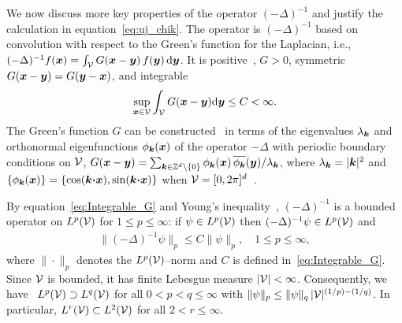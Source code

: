 \documentclass[amsa]{ipart}
\begin{document}
We now discuss more key properties of the operator $(-\Delta)^{-1}$ and
justify the calculation in equation~\eqref{eq:uj_chik}. The operator is
$(-\Delta)^{-1}$ based on convolution with respect to the Green's function
for the Laplacian, i.e.,
$(-\Delta)^{-1}f(\boldsymbol{x})=\int_{\mathcal{V}}G(\boldsymbol{x}-\boldsymbol{y})\,f(\boldsymbol{y})\,\mathrm{d}\boldsymbol{y}$. It is
positive~\cite{Stakgold:BVP:2000}, $G>0$,
symmetric~\cite{Folland:95:PDEs,Stakgold:BVP:2000}  
$G(\boldsymbol{x}-\boldsymbol{y})=G(\boldsymbol{y}-\boldsymbol{x})$,
and integrable~\cite{Melnikov:2012:Green,Melnikov2006774,McCann08042001}
%
\begin{align}\label{eq:Integrable_G}
 \sup_{\vecx\in\Vc} \int_{\Vc}G(\vecx-\vecy)\d\vecy\leq C<\infty.
\end{align}
%
The Green's function $G$ can be constructed~\cite{Melnikov:2012:Green}
in terms of the eigenvalues $\lambda_{\boldsymbol{k}}$ and orthonormal eigenfunctions
$\phi_{\boldsymbol{k}}(\boldsymbol{x})$ of the operator $-\Delta$ with periodic boundary
conditions on $\mathcal{V}$, $G(\boldsymbol{x}-\boldsymbol{y})=\sum_{\boldsymbol{k}\in\mathbb{Z}^d\backslash\{0\}}
\phi_{\boldsymbol{k}}(\boldsymbol{x})\,\overline{\phi_{\boldsymbol{k}}}(\boldsymbol{y})/\lambda_{\boldsymbol{k}}$,   
where $\lambda_{\boldsymbol{k}}=|\boldsymbol{k}|^2$ and
$\{\phi_{\boldsymbol{k}}(\boldsymbol{x})\}=\{\cos(\boldsymbol{k}\mbox{\boldmath${\cdot}$}\boldsymbol{x}),\sin(\boldsymbol{k}\mbox{\boldmath${\cdot}$}\boldsymbol{x})\}$
when $\mathcal{V}=[0,2\pi]^d$~\cite{Folland:99:RealAnalysis}.  



By equation~\eqref{eq:Integrable_G} and Young's
inequality~\cite{Folland:95:PDEs,Folland:99:RealAnalysis}, 
$(-\Delta)^{-1}$ is a bounded operator on $L^p(\mathcal{V})$ for $1\leq p\leq\infty$: if $\psi\in
L^p(\mathcal{V})$ then $(-\Delta)^{-1}\psi\in L^p(\mathcal{V})$ and   
%
\begin{align}\label{eq:Young_Ineq}
  \|(-\Delta)^{-1}\psi\|_p\leq C\|\psi\|_p,
  \quad
  1\leq p\leq\infty,
\end{align}
%
where $\|\cdot\|_p$ denotes the $L^p(\mathcal{V})$--norm and $C$ is defined
in~\eqref{eq:Integrable_G}. Since $\mathcal{V}$ is bounded, it has finite
Lebesgue measure $|\mathcal{V}|<\infty$. Consequently, we 
have~\cite{Folland:99:RealAnalysis} $L^p(\mathcal{V})\supset L^q(\mathcal{V})$ for all
$0<p<q\leq\infty$ with $\|\psi\|_p\leq\|\psi\|_q\,|\mathcal{V}|^{(1/p)-(1/q)}$. In particular,
$L^r(\mathcal{V})\subset L^2(\mathcal{V})$ for all $2<r\leq\infty$.
\end{document}
